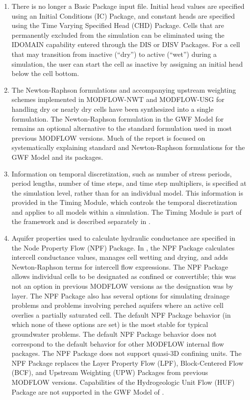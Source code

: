 \begin{enumerate}
\item There is no longer a Basic Package input file.  Initial head values are specified using an Initial Conditions (IC) Package, and constant heads are specified using the Time Varying Specified Head (CHD) Package.  Cells that are permanently excluded from the simulation can be eliminated using the IDOMAIN capability entered through the DIS or DISV Packages.  For a cell that may transition from inactive (``dry'') to active (``wet'') during a simulation, the user can start the cell as inactive by assigning an initial head below the cell bottom.

\item The Newton-Raphson formulations and accompanying upstream weighting schemes implemented in MODFLOW-NWT and MODFLOW-USG for handling dry or nearly dry cells have been synthesized into a single formulation.  The Newton-Raphson formulation in the GWF Model for \mf remains an optional alternative to the standard formulation used in most previous MODFLOW versions. Much of the \cite{modflow6gwf} report is focused on systematically explaining standard and Newton-Raphson formulations for the GWF Model and its packages.

\item Information on temporal discretization, such as number of stress periods, period lengths, number of time steps, and time step multipliers, is specified at the simulation level, rather than for an individual model.  This information is provided in the Timing Module, which controls the temporal discretization and applies to all models within a simulation.  The Timing Module is part of the \mf framework and is described separately in \cite{modflow6framework}.

\item Aquifer properties used to calculate hydraulic conductance are specified in the Node Property Flow (NPF) Package.  In \mf, the NPF Package calculates intercell conductance values, manages cell wetting and drying, and adds Newton-Raphson terms for intercell flow expressions.  The NPF Package allows individual cells to be designated as confined or convertible; this was not an option in previous MODFLOW versions as the designation was by layer.  The NPF Package also has several options for simulating drainage problems and problems involving perched aquifers where an active cell overlies a partially saturated cell.  The default NPF Package behavior (in which none of these options are set) is the most stable for typical groundwater problems.  The default NPF Package behavior does not correspond to the default behavior for other MODFLOW internal flow packages.  The NPF Package does not support quasi-3D confining units.  The NPF Package replaces the Layer Property Flow (LPF), Block-Centered Flow (BCF), and Upstream Weighting (UPW) Packages from previous MODFLOW versions.  Capabilities of the Hydrogeologic Unit Flow (HUF) Package \citep{anderman2000modflow, anderman2003modflow} are not supported in the GWF Model of \mf.


\end{enumerate}
